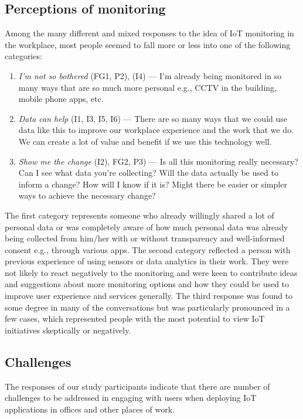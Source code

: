 \subsection{Perceptions of monitoring}
\label{sec:perc-monit}
Among the many different and mixed responses to the idea of IoT
monitoring in the workplace, most people seemed to fall more or less
into one of the following categories:
\begin{enumerate}
\item \textit{I'm not so bothered} (FG1, P2), (I4) --- I'm already being monitored in so many ways
  that are so much more personal e.g., CCTV in the building, mobile
  phone apps, etc. 
\item \textit{Data can help} (I1, I3, I5, I6) --- There are so many ways that we could use
  data like this to improve our workplace experience and the work that we do. We can create a lot of value and benefit if we use this technology well. 
\item \textit{Show me the change} (I2), FG2, P3) --- Is all this monitoring really necessary?
  Can I see what data you’re collecting? Will the data actually be
  used to inform a change? How will I know if it is? Might there be
  easier or simpler ways to achieve the necessary change? 
\end{enumerate}
The first category represents someone who already willingly shared a
lot of personal data or was completely aware of how much personal data
was already being collected from him/her with or without transparency
and well-informed consent e.g., through various apps. The second
category reflected a person with previous experience of using sensors
or data analytics in their work. They were not likely to react
negatively to the monitoring and were keen to contribute ideas and
suggestions about more monitoring options and how they could be used
to improve user experience and services generally. The third response
was found to some degree in many of the conversations but was
particularly pronounced in a few cases, which represented people with
the most potential to view IoT initiatives skeptically or negatively.

\subsection{Challenges}
\label{sec:challenges}

The responses of our study participants indicate that there are number
of challenges to be addressed in engaging with users when deploying
IoT applications in offices and other places of work.

